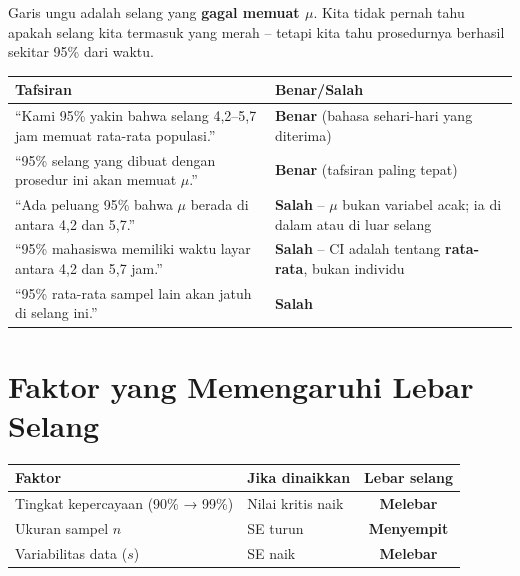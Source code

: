 \documentclass[
  indonesian,
  letterpaper,
]{book}
\newcounter{none} %
\begin{document}
Garis ungu adalah selang yang \textbf{gagal memuat \(\mu\)}. Kita tidak
pernah tahu apakah selang kita termasuk yang merah -- tetapi kita tahu
prosedurnya berhasil sekitar 95\% dari waktu.

{\def\LTcaptype{none} %
\begin{longtable}[]{@{}
  >{\raggedright\arraybackslash}p{}
  >{\centering\arraybackslash}p{}@{}}
\toprule\noalign{}
\begin{minipage}[b]{\linewidth}\raggedright
Tafsiran
\end{minipage} & \begin{minipage}[b]{\linewidth}\centering
Benar/Salah
\end{minipage} \\
\midrule\noalign{}
\endhead
\bottomrule\noalign{}
\endlastfoot
``Kami 95\% yakin bahwa selang 4,2--5,7 jam memuat rata-rata populasi.''
& \textbf{Benar} (bahasa sehari-hari yang diterima) \\
``95\% selang yang dibuat dengan prosedur ini akan memuat \(\mu\).'' &
\textbf{Benar} (tafsiran paling tepat) \\
``Ada peluang 95\% bahwa \(\mu\) berada di antara 4,2 dan 5,7.'' &
\textbf{Salah} -- \(\mu\) bukan variabel acak; ia di dalam atau di luar
selang \\
``95\% mahasiswa memiliki waktu layar antara 4,2 dan 5,7 jam.'' &
\textbf{Salah} -- CI adalah tentang \textbf{rata-rata}, bukan
individu \\
``95\% rata-rata sampel lain akan jatuh di selang ini.'' &
\textbf{Salah} \\
\end{longtable}
}

\section{Faktor yang Memengaruhi Lebar
Selang}\label{faktor-yang-memengaruhi-lebar-selang}

{\def\LTcaptype{none} %
\begin{longtable}[]{@{}llc@{}}
\toprule\noalign{}
Faktor & Jika dinaikkan & Lebar selang \\
\midrule\noalign{}
\endhead
\bottomrule\noalign{}
\endlastfoot
Tingkat kepercayaan (90\% → 99\%) & Nilai kritis naik &
\textbf{Melebar} \\
Ukuran sampel \(n\) & SE turun & \textbf{Menyempit} \\
Variabilitas data (\(s\)) & SE naik & \textbf{Melebar} \\
\end{longtable}
}
\end{document}
